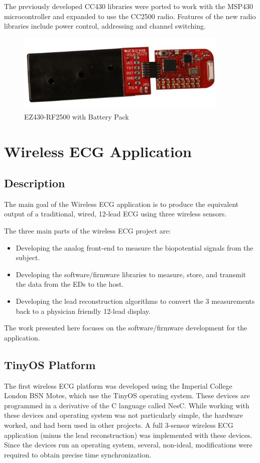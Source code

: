 \documentclass{article}
\begin{document}
The previously developed CC430 libraries were ported to work with the MSP430 microcontroller and expanded to use the CC2500 radio. Features of the new radio libraries include power control, addressing and channel switching.

\begin{figure}[htb]
\begin{center}
\includegraphics[width=0.9\textwidth]{figures/ez430-rf2500.pdf}
\end{center}
\caption{EZ430-RF2500 with Battery Pack}
\label{fig:ez430}
\end{figure}

\section{Wireless ECG Application}\label{section:wirelessecg}
\subsection{Description}
The main goal of the Wireless ECG application is to produce the equivalent output of a traditional, wired, 12-lead ECG using three wireless sensors. 

The three main parts of the wireless ECG project are: 
\begin{itemize}
\item Developing the analog front-end to measure the biopotential signals from the subject.
\item Developing the software/firmware libraries to measure, store, and transmit the data from the EDs to the host.
\item Developing the lead reconstruction algorithms to convert the 3 measurements back to a physician friendly 12-lead display.
\end{itemize}
The work presented here focuses on the software/firmware development for the application.

\subsection{TinyOS Platform}
The first wireless ECG platform was developed using the Imperial College London BSN Motes, which use the TinyOS operating system. These devices are programmed in a derivative of the C language called NesC. While working with these devices and operating system was not particularly simple, the hardware worked, and had been used in other projects. A full 3-sensor wireless ECG application (minus the lead reconstruction) was implemented with these devices. Since the devices run an operating system, several, non-ideal, modifications were required to obtain precise time synchronization.
\end{document}
